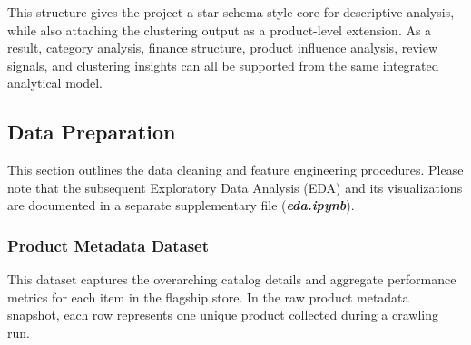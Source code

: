         This structure gives the project a star-schema style core for descriptive analysis, while also attaching the clustering output as a product-level extension. As a result, category analysis, finance structure, product influence analysis, review signals, and clustering insights can all be supported from the same integrated analytical model.

    \subsection{Data Preparation}
    This section outlines the data cleaning and feature engineering procedures. Please note that the subsequent Exploratory Data Analysis (EDA) and its visualizations are documented in a separate supplementary file (\textit{\textbf{eda.ipynb}}).
        \subsubsection{Product Metadata Dataset}
        This dataset captures the overarching catalog details and aggregate performance metrics for each item in the flagship store. In the raw product metadata snapshot, each row represents one unique product collected during a crawling run.
